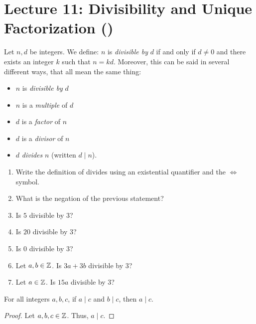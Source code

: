 \section*{Lecture 11: Divisibility and Unique Factorization ()}

\begin{definition}[Divides]
    Let $n,d$ be integers.  We define: $n$ is \emph{divisible by} $d$
    if and only if
    $d \neq 0$ and there exists an integer $k$ such
    that $n=kd$.  Moreover, this can be said in several different ways, that all
    mean the same thing:
    \begin{itemize}
        \item $n$ is \emph{divisible by} $d$
        \item $n$ is a \emph{multiple} of $d$
        \item $d$ is a \emph{factor} of $n$
        \item $d$ is a \emph{divisor} of $n$
        \item $d$ \emph{divides} $n$ (written $d \mid n$).
    \end{itemize}
\end{definition}



\begin{enumerate}
    \item Write the definition of divides using an existential quantifier and
        the $\iff$ symbol.
       \practice
    \item What is the negation of the previous statement?
       \practice
    \item Is $5$ divisible by $3$?
       \practice
    \pagebreak
    \item Is $20$ divisible by $3$?
       \practice
    \item Is $0$ divisible by $3$?
       \practice
    \item Let $a,b \in {\mathbb Z}$. Is $3a+3b$ divisible by $3$?
       \practice
    \item Let $a \in {\mathbb Z}$. Is $15a$ divisible by $3$?
       \practice
\end{enumerate}


\pagebreak

\begin{theorem}
    For all integers $a,b,c$, if $a \mid c$ and $b \mid c$, then $a \mid c$.
\end{theorem}
\begin{proof}
    Let $a,b,c \in {\mathbb Z}$.
    \proofspace
    Thus, $a \mid c$.
\end{proof}

